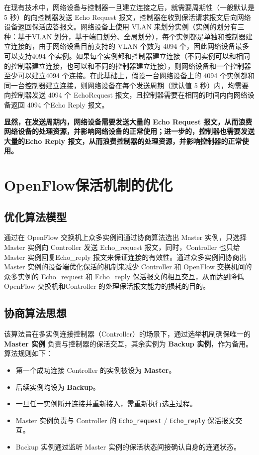\documentclass{article}
\begin{document}
在现有技术中，网络设备与控制器一旦建立连接之后，就需要周期性（一般默认是 5 秒）的向控制器发送 Echo Request 报文，控制器在收到保活请求报文后向网络设备返回保活应答报文。网络设备上使用 VLAN 来划分实例（实例的划分有三种：基于VLAN 划分，基于端口划分、全局划分），每个实例都是单独和控制器建立连接的，由于网络设备目前支持的 VLAN 个数为 4094 个，因此网络设备最多可以支持4094 个实例。如果每个实例都和控制器建立连接（不同实例可以和相同的控制器建立连接，也可以和不同的控制器建立连接），则网络设备和一个控制器至少可以建立4094 个连接。在此基础上，假设一台网络设备上的 4094 个实例都和同一台控制器建立连接，则网络设备在每个发送周期（默认值 5 秒）内，均需要向控制器发送 4094 个 EchoRequest 报文，且控制器需要在相同的时间内向网络设备返回 4094 个Echo Reply 报文。

\textbf{显然，在发送周期内，网络设备需要发送大量的 Echo Request 报文，从而浪费网络设备的处理资源，并影响网络设备的正常使用；进一步的，控制器也需要发送大量的Echo Reply 报文，从而浪费控制器的处理资源，并影响控制器的正常使用。}\cite{wanfang_openflow}


\section{OpenFlow保活机制的优化}

\subsection{\textbf{优化算法模型}}
\quad\quad 通过在 OpenFlow 交换机上众多实例间通过协商算法选出 Master 实例，只选择Master 实例向 Controller 发送 Echo\_request 报文，同时，Controller 也只给 Master 实例回复Echo\_reply 报文来保证连接的有效性。通过众多实例间协商出 Master 实例的设备端优化保活的机制来减少 Controller 和 OpenFlow 交换机间的众多实例的
Echo\_request 和 Echo\_reply 保活报文的相互交互，从而达到降低 OpenFlow 交换机和Controller 的处理保活报文能力的损耗的目的。


\subsection{\textbf{协商算法思想}}

\quad\quad 该算法旨在多实例\cite{youkud}连接控制器（Controller）的场景下，通过选举机制确保唯一的 \textbf{Master 实例} 负责与控制器的保活交互，其余实例为 \textbf{Backup 实例}，作为备用。算法规则如下：

\begin{itemize}
    \item 第一个成功连接 Controller 的实例被设为 \textbf{Master}。
    \item 后续实例均设为 \textbf{Backup}。
    \item 一旦任一实例断开连接并重新接入，需重新执行选主过程。
    \item Master 实例负责与 Controller 的 \texttt{Echo\_request} / \texttt{Echo\_reply} 保活报文交互。
    \item Backup 实例通过监听 Master 实例的保活状态间接确认自身的连通状态。
\end{itemize}
\end{document}

